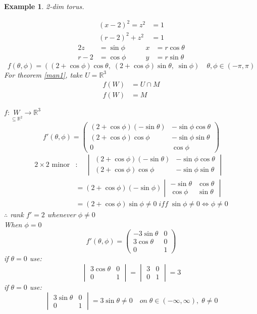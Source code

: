 \documentclass[11pt]{article}
\def\RR{\mathbb{R}}
\newtheorem{example}{Example}[section]
\begin{document}
\begin{example}2-dim torus.

\begin{align*}
(x-2)^2 = z^2 &=1\\
(r-2)^2 + z^2 &= 1 \end{align*}
\begin{alignat*}{2}
z&=\sin\phi &\qquad x&=r\cos\theta\\
r-2&=\cos\phi &\qquad y&=r\sin\theta
\end{alignat*}
\[f(\theta,\phi)= ((2+\cos\phi)\cos\theta, \; (2+\cos\phi)\sin\theta, \; \sin\phi) \quad \theta, \phi \in (-\pi , \pi )\]
For theorem \ref{man1}, take $U=\RR^3$
\begin{align*}
f(W) &= U\cap M\\
f(W) &= M
\end{align*}

$f:\underset{\subseteq \RR^2}{W} \rightarrow \RR^3$
\[f'(\theta, \phi) = \begin{pmatrix}  (2+\cos\phi)(-\sin\theta) &-\sin\phi \cos\theta \\
(2+\cos\phi)\cos\phi & -\sin\phi \sin\theta\\
0 & \cos\phi \end{pmatrix}\]
\begin{align*} 2 \times 2\text{ minor}&: \quad \begin{vmatrix}  (2+\cos\phi)(-\sin\theta) &-\sin\phi \cos\theta \\
(2+\cos\phi)\cos\phi & -\sin\phi \sin\theta \end{vmatrix}\\ &= (2+\cos\phi)(-\sin\phi) \begin{vmatrix}  -\sin\theta & \cos\theta \\ \cos\phi &  \sin\theta \end{vmatrix}\\
&=  (2+\cos\phi)\sin\phi \neq 0 \; iff\; \sin\phi \neq 0 \Leftrightarrow \phi \neq 0\end{align*}
$\therefore$ rank $f' = 2$ whenever $\phi \neq 0$\\
When $\phi =0$ 
\[f'(\theta, \phi) = \begin{pmatrix} -3\sin\theta & 0\\ 3\cos\theta & 0 \\ 0 & 1 \end{pmatrix}\]
if $\theta = 0$ use:
\[\begin{vmatrix} 3\cos\theta & 0 \\ 0 & 1 \end{vmatrix} = \begin{vmatrix} 3 & 0 \\ 0 & 1 \end{vmatrix} = 3\]
if $\theta = 0$ use:
\[\begin{vmatrix} 3\sin\theta & 0 \\ 0 & 1 \end{vmatrix} = 3\sin\theta \neq 0 \quad on \; \theta\in (-\infty, \infty), \; \theta \neq 0\]
\end{example}
\end{document}

